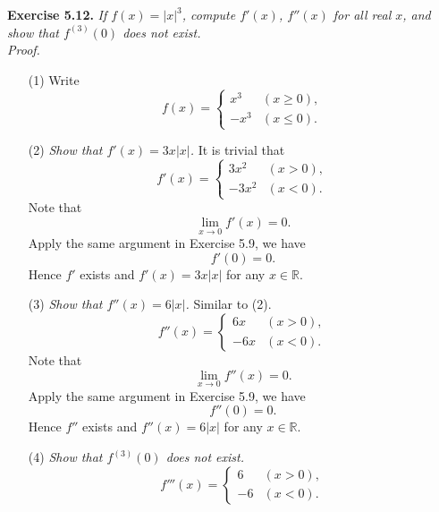\documentclass{article}
\begin{document}



\textbf{Exercise 5.12.}
\emph{If $f(x) = |x|^3$, compute $f'(x)$, $f''(x)$ for all real $x$,
and show that $f^{(3)} (0)$ does not exist.} \\

\emph{Proof.}
\begin{enumerate}
  \item[(1)]
  Write
  \begin{equation*}
    f(x) =
    \begin{cases}
      x^3 & (x \geq 0), \\
      -x^3 & (x \leq 0).
    \end{cases}
  \end{equation*}

  \item[(2)]
  \emph{Show that $f'(x) = 3x|x|$.}
  It is trivial that
  \begin{equation*}
    f'(x) =
    \begin{cases}
      3x^2 & (x > 0), \\
      -3x^2 & (x < 0).
    \end{cases}
  \end{equation*}
  Note that
  \[
    \lim_{x \to 0} f'(x) = 0.
  \]
  Apply the same argument in Exercise 5.9, we have
  \[
    f'(0) = 0.
  \]
  Hence $f'$ exists and $f'(x) = 3x|x|$ for any $x \in \mathbb{R}$.

  \item[(3)]
  \emph{Show that $f''(x) = 6|x|$.}
  Similar to (2).
  \begin{equation*}
    f''(x) =
    \begin{cases}
      6x & (x > 0), \\
      -6x & (x < 0).
    \end{cases}
  \end{equation*}
  Note that
  \[
    \lim_{x \to 0} f''(x) = 0.
  \]
  Apply the same argument in Exercise 5.9, we have
  \[
    f''(0) = 0.
  \]
  Hence $f''$ exists and $f''(x) = 6|x|$ for any $x \in \mathbb{R}$.

  \item[(4)]
  \emph{Show that $f^{(3)} (0)$ does not exist.}
  \begin{equation*}
    f'''(x) =
    \begin{cases}
      6 & (x > 0), \\
      -6 & (x < 0).
    \end{cases}
  \end{equation*}


\end{enumerate}
\end{document}
